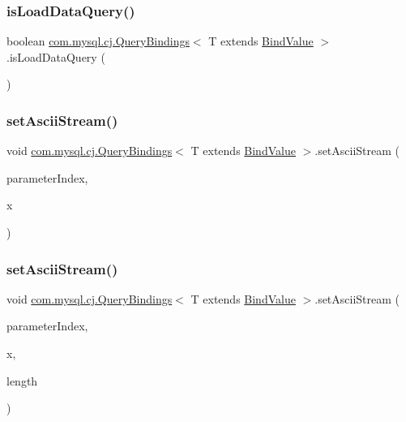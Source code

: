 \subsubsection{\texorpdfstring{is\+Load\+Data\+Query()}{isLoadDataQuery()}}
{\footnotesize\ttfamily boolean \mbox{\hyperlink{interfacecom_1_1mysql_1_1cj_1_1_query_bindings}{com.\+mysql.\+cj.\+Query\+Bindings}}$<$ T extends \mbox{\hyperlink{interfacecom_1_1mysql_1_1cj_1_1_bind_value}{Bind\+Value}} $>$.is\+Load\+Data\+Query (\begin{DoxyParamCaption}{ }\end{DoxyParamCaption})}

\mbox{\label{interfacecom_1_1mysql_1_1cj_1_1_query_bindings_a2ab9574b9dd0d2b15039d0516cc45ba1}} 
\subsubsection{\texorpdfstring{set\+Ascii\+Stream()}{setAsciiStream()}\hspace{0.1cm}{\footnotesize\ttfamily [1/3]}}
{\footnotesize\ttfamily void \mbox{\hyperlink{interfacecom_1_1mysql_1_1cj_1_1_query_bindings}{com.\+mysql.\+cj.\+Query\+Bindings}}$<$ T extends \mbox{\hyperlink{interfacecom_1_1mysql_1_1cj_1_1_bind_value}{Bind\+Value}} $>$.set\+Ascii\+Stream (\begin{DoxyParamCaption}\item[{int}]{parameter\+Index,  }\item[{Input\+Stream}]{x }\end{DoxyParamCaption})}

\mbox{\label{interfacecom_1_1mysql_1_1cj_1_1_query_bindings_af740826505342555c0e7d37aab27196e}} 
\subsubsection{\texorpdfstring{set\+Ascii\+Stream()}{setAsciiStream()}\hspace{0.1cm}{\footnotesize\ttfamily [2/3]}}
{\footnotesize\ttfamily void \mbox{\hyperlink{interfacecom_1_1mysql_1_1cj_1_1_query_bindings}{com.\+mysql.\+cj.\+Query\+Bindings}}$<$ T extends \mbox{\hyperlink{interfacecom_1_1mysql_1_1cj_1_1_bind_value}{Bind\+Value}} $>$.set\+Ascii\+Stream (\begin{DoxyParamCaption}\item[{int}]{parameter\+Index,  }\item[{Input\+Stream}]{x,  }\item[{int}]{length }\end{DoxyParamCaption})}

